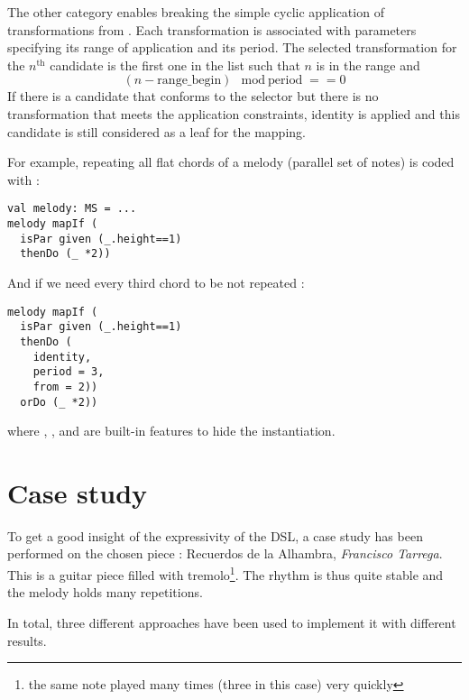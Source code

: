 \documentclass[twocolumn, 11pt]{article}
\begin{document}
The other category enables breaking the simple cyclic application of transformations from . Each transformation is associated with parameters specifying its range of application and its period. The selected transformation for the $n^{\text{th}}$ candidate is the first one in the list such that $n$ is in the range and
$$(n - \text{range\_begin}) \mod \text{period} == 0$$
If there is a candidate that conforms to the selector but there is no transformation that meets the application constraints, identity is applied and this candidate is still considered as a leaf for the mapping.



For example, repeating all flat chords of a melody (parallel set of notes) is coded with :
\begin{lstlisting}
val melody: MS = ...
melody mapIf (
  isPar given (_.height==1)
  thenDo (_ *2))
\end{lstlisting}
And if we need every third chord to be not repeated :
\begin{lstlisting}
melody mapIf (
  isPar given (_.height==1)
  thenDo (
    identity,
    period = 3,
    from = 2))
  orDo (_ *2))
\end{lstlisting}
where , ,  and  are built-in features to hide the  instantiation.



\section{Case study}
To get a good insight of the expressivity of the DSL, a case study has been performed on the chosen piece : Recuerdos de la Alhambra, \emph{Francisco Tarrega}. This is a guitar piece filled with tremolo\footnote{the same note played many times (three in this case) very quickly}. The rhythm is thus quite stable and the melody holds many repetitions.

In total, three different approaches have been used to implement it with different results.
\end{document}
